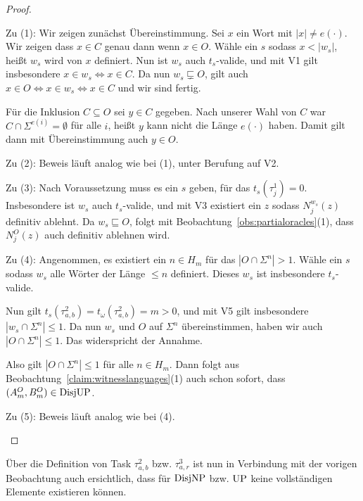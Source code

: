 \begin{proof}
    \begin{prooflist}
    \item Zu (1): Wir zeigen zunächst Übereinstimmung. Sei $x$ ein Wort mit $|x|\neq e(\cdot)$. Wir zeigen dass $x\in C$ genau dann wenn $x\in O$. Wähle ein $s$ sodass $x<|w_s|$, heißt $w_s$ wird von $x$ definiert. Nun ist $w_s$ auch $t_s$-valide, und mit V1 gilt insbesondere $x\in w_s \iff x\in C$.
        Da nun $w_s\sqsubsetneq O$, gilt auch $x\in O \iff x\in w_s \iff x\in C$ und wir sind fertig.

        Für die Inklusion $C\subseteq O$ sei $y\in C$ gegeben. Nach unserer Wahl von $C$ war $C\cap\Sigma^{e(i)}=\emptyset$ für alle $i$, heißt $y$ kann nicht die Länge $e(\cdot)$ haben.
        Damit gilt dann mit Übereinstimmung auch $y\in O$.
        
    \item Zu (2): Beweis läuft analog wie bei (1), unter Berufung auf V2.

    \item Zu (3): Nach Voraussetzung muss es ein $s$ geben, für das $t_s(\tau^1_j)=0$. Insbesondere ist $w_s$ auch $t_s$-valide, und mit V3 existiert ein $z$ sodass $N_j^{w_s}(z)$ definitiv ablehnt.
        Da $w_s\sqsubseteq O$, folgt mit Beobachtung~\ref{obs:partialoracles}(1), dass $N_j^O(z)$ auch definitiv ablehnen wird.

    \item Zu (4): Angenommen, es existiert ein $n\in H_m$ für das $|O\cap\Sigma^n|>1$.
        Wähle ein $s$ sodass $w_s$ alle Wörter der Länge $\leq n$ definiert. Dieses $w_s$ ist insbesondere $t_s$-valide.

        Nun gilt $t_s(\tau^2_{a,b})=t_\omega(\tau^2_{a,b})=m>0$, und mit V5 gilt insbesondere $|w_s\cap\Sigma^n|\leq 1$.
        Da nun $w_s$ und $O$ auf $\Sigma^{n}$ übereinstimmen, haben wir auch $|O\cap\Sigma^n|\leq 1$. Das widerspricht der Annahme.

        Also gilt $|O\cap\Sigma^n|\leq 1$ für alle $n\in H_m$. Dann folgt aus Beobachtung~\ref{claim:witnesslanguages}(1) auch schon sofort, dass $(A_m^O, B_m^O)\in\mathrm{DisjUP}$.

    \item Zu (5): Beweis läuft analog wie bei (4).
    \end{prooflist}
\end{proof}

Über die Definition von Task $\tau^2_{a,b}$ bzw. $\tau^3_{a,r}$ ist nun in Verbindung mit der vorigen Beobachtung auch ersichtlich, dass für $\mathrm{DisjNP}$ bzw. $\mathrm{UP}$ keine vollständigen Elemente existieren können.

